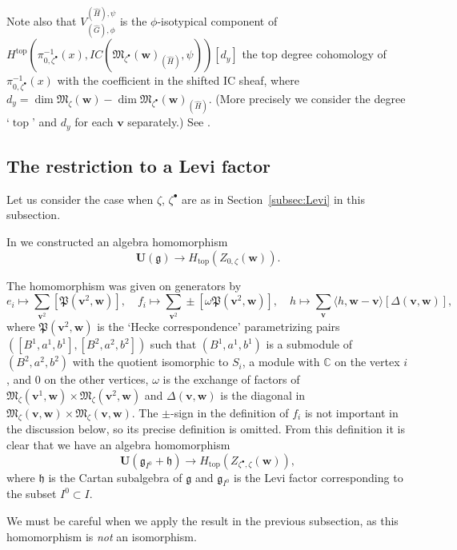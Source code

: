 \documentclass[11pt]{article}
\theoremstyle{definition}
\numberwithin{equation}{section}
\newcommand{\subsecref}[1]{Section~\ref{#1}}
\newcommand{\C}{{\mathbb C}}
\newcommand{\g}{{\mathfrak g}}
\newcommand{\M}{{\mathfrak M}} %
\newcommand{\bv}{{\mathbf v}} %
\newcommand{\bw}{{\mathbf w}} %
\newcommand{\topdeg}{{\operatorname{top}}} %
\newcommand{\bU}{\mathbf U} %
\newcommand{\Pa}{{\mathfrak P}} %
\begin{document}
Note also that $V_{(\widehat G),\phi}^{(\widehat H),\psi}$ is the
$\phi$-isotypical component of
\(
   H^{\topdeg}(\pi_{0,\zeta^\bullet}^{-1}(x),
   IC(\M_{\zeta^\bullet}(\bw)_{(\widehat H)},\psi))[d_y]
\)
the top degree cohomology of $\pi_{0,\zeta^\bullet}^{-1}(x)$ with the
coef\/f\/icient in the shifted IC sheaf, where
$d_y = \dim \M_\zeta(\bw) - \dim \M_{\zeta^\bullet}(\bw)_{(\widehat H)}$.
(More precisely we consider the degree `$\topdeg$' and $d_y$ for each
$\bv$ separately.) See \cite[1.10]{BM}.


\subsection{The restriction to a Levi factor}\label{subsec:rest_Levi}

Let us consider the case when $\zeta$, $\zeta^\bullet$ are as in
\subsecref{subsec:Levi} in this subsection.

In \cite{Na-alg} we constructed an algebra homomorphism
\begin{equation*}
   \bU(\g) \to H_{\topdeg}(Z_{0,\zeta}(\bw)).
\end{equation*}

The homomorphism was given on generators by
\begin{equation*}
   e_i \mapsto \sum_{\bv^2} [\Pa(\bv^2,\bw)],\quad
   f_i \mapsto \sum_{\bv^2} \pm [\omega\Pa(\bv^2,\bw)], \quad
   h \mapsto \sum_{\bv} \langle h, \bw - \bv\rangle [\Delta(\bv,\bw)],
\end{equation*}
where $\Pa(\bv^2,\bw)$ is the `Hecke correspondence' parametrizing
pairs $([B^1,a^1,b^1],[B^2,a^2,b^2])$ such that $(B^1,a^1,b^1)$ is a
submodule of $(B^2,a^2,b^2)$ with the quotient isomorphic to $S_i$, a
module with $\C$ on the vertex $i$, and $0$ on the other vertices,
$\omega$ is the exchange of factors of $\M_\zeta(\bv^1,\bw)\times
\M_\zeta(\bv^2,\bw)$ and $\Delta(\bv,\bw)$ is the diagonal in
$\M_\zeta(\bv,\bw)\times \M_\zeta(\bv,\bw)$. The $\pm$-sign in the
def\/inition of $f_i$ is not important in the discussion below, so its
precise def\/inition is omitted.
%
From this def\/inition it is clear that we have an algebra homomorphism
\begin{equation*}
   \bU(\g_{I^0}+\mathfrak h) \to H_{\topdeg}(Z_{\zeta^\bullet,\zeta}(\bw)),
\end{equation*}
where $\mathfrak h$ is the Cartan subalgebra of $\g$ and $\g_{I^0}$ is
the Levi factor corresponding to the subset $I^0\subset I$.

We must be careful when we apply the result in the previous
subsection, as this homomorphism is {\it not\/} an isomorphism.
\end{document}
